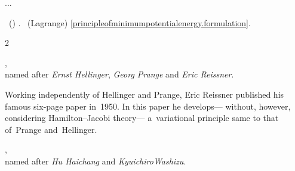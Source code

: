 ...

   ~() .
    ~(Lagrange)  \eqref{principleofminimumpotentialenergy.formulation}.



\label{para:mixedvariationalprinciples}

\vspace{.2em}\begin{changemargin}{2\parindent}{\parindent}
\bgroup %
\setlength{\parindent}{\negparindent}
\small

\hspace{\parindent}\href{https://en.wikiversity.org/wiki/Introduction_to_Elasticity/Hellinger-Reissner_principle}{},\\
named after \emph{Ernst Hellinger}, \emph{Georg Prange} and \emph{Eric Reissner}.
\par

\nopagebreak\vspace{.16em}
{\noindent
\scriptsize
Working independently of Hellinger and Prange, Eric Reissner published his famous six\hbox{-}page paper  in~1950. In this paper he develops\:--- without, however, considering Hamilton\hbox{--}Jacobi theory\:--- a~variational principle same to that of~Prange and~Hellinger.
\par}

\nopagebreak\vspace{.32em}
\href{https://en.wikiversity.org/wiki/Introduction_to_Elasticity/Hu-Washizu_principle}{},\\
named after \emph{Hu Haichang} and \emph{Kyuichiro\;Washizu}.
\par
\egroup
\nopagebreak\vspace{.1em}
\end{changemargin}

